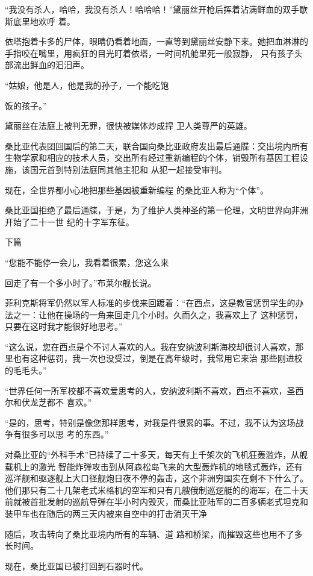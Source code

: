\documentclass{article}
\begin{document}
“我没有杀人，哈哈，我没有杀人！哈哈哈！”黛丽丝开枪后挥着沾满鲜血的双手歇斯底里地欢呼
着。 

依塔抱着卡多的尸体，眼睛仍看着地面，一直等到黛丽丝安静下来。她把血淋淋的手指咬在嘴里，用疯狂的目光盯着依塔，一时间机舱里死一般寂静，
只有孩子头部流出鲜血的汩汩声。 

“姑娘，他是人，他是我的孙子，一个能吃饱

\newpage
饭的孩子。” 

黛丽丝在法庭上被判无罪，很快被媒体炒成捍
卫人类尊严的英雄。 

桑比亚代表团回国后的第二天，联合国向桑比亚政府发出最后通牒：交出境内所有生物学家和相应的技术人员，交出所有经过重新编程的个体，销毁所有基因工程设施，该国元首到特别法庭同其他主犯和
从犯一起接受审判。 

现在，全世界都小心地把那些基因被重新编程
的桑比亚人称为“个体”。 

桑比亚国拒绝了最后通牒，于是，为了维护人类神圣的第一伦理，文明世界向非洲开始了二十一世
纪的十字军东征。 


下篇 

“您能不能停一会儿，我看着很累，您这么来

\newpage
回走了有一个多小时了。”布莱尔舰长说。 

菲利克斯将军仍然以军人标准的步伐来回踱着：“在西点，这是教官惩罚学生的办法之一：让他在操场的一角来回走几个小时。久而久之，我喜欢上了
这种惩罚，只要在这时我才能很好地思考。” 

“这么说，您在西点是个不讨人喜欢的人。我在安纳波利斯海校却很讨人喜欢，那里也有这种惩罚，我一次也没受过，倒是在高年级时，我常用它来治
那些刚进校的毛毛头。” 

“世界任何一所军校都不喜欢爱思考的人，安纳波利斯不喜欢，西点不喜欢，圣西尔和伏龙芝都不
喜欢。” 

“是的，思考，特别是像您那样思考，对我是件很累的事。不过，我不认为这场战争有很多可以思
考的东西。” 

对桑比亚的“外科手术”已持续了二十多天，每天有上千架次的飞机狂轰滥炸，从舰载机上的激光
\newpage
智能炸弹攻击到从阿森松岛飞来的大型轰炸机的地毯式轰炸，还有巡洋舰和驱逐舰上大口径舰炮日夜不停的轰击，这个非洲穷国实在剩不下什么了。他们那只有二十几架老式米格机的空军和只有几艘俄制巡逻艇的的海军，在二十天前就被首批发射的巡航导弹在半小时内毁灭，而桑比亚陆军的二百多辆老式坦克和装甲车也在随后的两三天内被来自空中的打击消灭干净

随后，攻击转向了桑比亚境内所有的车辆、道
路和桥梁，而摧毁这些也用不了多长时间。 


现在，桑比亚国已被打回到石器时代。 
\end{document}
